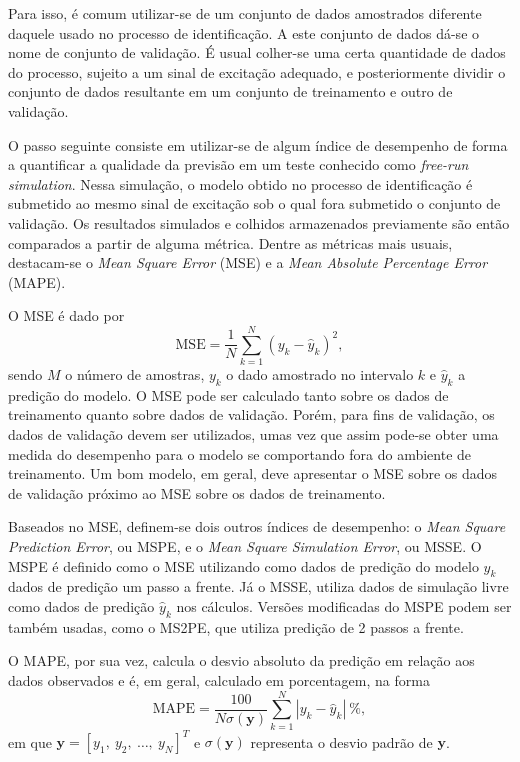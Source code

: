 Para  isso, é comum utilizar-se de um conjunto de dados amostrados diferente daquele usado no processo de identificação. A este conjunto de dados dá-se o nome de conjunto de validação. É usual colher-se uma certa quantidade de dados do processo, sujeito a um sinal de excitação adequado, e posteriormente dividir o conjunto de dados resultante em um conjunto de treinamento e outro de validação.

O passo seguinte consiste em utilizar-se de algum índice de desempenho de forma a quantificar a qualidade da previsão em um teste conhecido como \textit{free-run simulation}. Nessa simulação, o modelo obtido no processo de identificação é submetido ao mesmo sinal de excitação sob o qual fora submetido o conjunto de validação. Os resultados simulados e colhidos armazenados previamente são então comparados a partir de alguma métrica. Dentre as métricas mais usuais, destacam-se o \textit{Mean Square Error} (MSE) e a \textit{Mean Absolute Percentage Error} (MAPE).

O MSE é dado por
\begin{equation}
\label{eq:MSE}
   \text{MSE} = \frac{1}{N}\sum_{k=1}^{N}(y_k-\hat{y}_k)^2,
\end{equation}
sendo $M$ o número de amostras, $y_k$ o dado amostrado no intervalo $k$ e $\hat{y}_k$ a predição do modelo. O MSE pode ser calculado tanto sobre os dados de treinamento quanto sobre dados de validação. Porém, para fins de validação, os dados de validação devem ser utilizados, umas vez que assim pode-se obter uma medida do desempenho para o modelo se comportando fora do ambiente de treinamento. Um bom modelo, em geral, deve apresentar o MSE sobre os dados de validação próximo ao MSE sobre os dados de treinamento. 

Baseados no MSE, definem-se dois outros índices de desempenho: o \textit{Mean Square Prediction Error}, ou MSPE, e o \textit{Mean Square Simulation Error}, ou MSSE.
O MSPE é definido como o MSE utilizando como dados de predição do modelo $\hat{y}_k$ dados de predição um passo a frente. Já o MSSE, utiliza dados de simulação livre como dados de predição $\hat{y}_k$ nos cálculos. Versões modificadas do MSPE podem ser também usadas, como o MS2PE, que utiliza predição de 2 passos a frente.

O MAPE, por sua vez, calcula o desvio absoluto da predição em relação aos dados observados e é, em geral, calculado em porcentagem, na forma
\begin{equation}
\label{eq:MAPE}
   \text{MAPE} =  \frac{100}{N{\sigma(\bm{y})}}\sum_{k=1}^{N} {|y_k - \hat{y}_k|}\ \%, %
\end{equation}
em que $\bm{y}=[y_1,\ y_2,\ \dots,\ y_N]^T$ e $\sigma(\bm{y})$ representa o desvio padrão de $\bm{y}$. 

